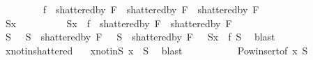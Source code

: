 \begin{isabellebody}
\begin{isamarkuptext}
\end{isamarkuptext}\isamarkuptrue%
\ \ \ \ \ \ \isamarkupfalse%
\ {}{\isacharcolon}{\kern0pt}\ {\isachardoublequoteopen}{\isacharquery}{\kern0pt}f\ {\isacharbackquote}{\kern0pt}\ {\isacharparenleft}{\kern0pt}shattered{\isacharunderscore}{\kern0pt}by\ {\isacharquery}{\kern0pt}F{}\ {\isasyminter}\ shattered{\isacharunderscore}{\kern0pt}by\ {\isacharquery}{\kern0pt}F{}{\isacharparenright}{\kern0pt}\ {\isasymsubseteq}\ shattered{\isacharunderscore}{\kern0pt}by\ F{\isachardoublequoteclose}\isanewline
\ \ \ \ \ \ \isamarkupfalse%
\ \isanewline
\ \ \ \ \ \ \ \ \isamarkupfalse%
\ S{\isacharunderscore}{\kern0pt}x\isanewline
\ \ \ \ \ \ \ \ \isamarkupfalse%
\ {\isachardoublequoteopen}S{\isacharunderscore}{\kern0pt}x\ {\isasymin}\ {\isacharquery}{\kern0pt}f\ {\isacharbackquote}{\kern0pt}\ {\isacharparenleft}{\kern0pt}shattered{\isacharunderscore}{\kern0pt}by\ {\isacharquery}{\kern0pt}F{}\ {\isasyminter}\ shattered{\isacharunderscore}{\kern0pt}by\ {\isacharquery}{\kern0pt}F{}{\isacharparenright}{\kern0pt}{\isachardoublequoteclose}\isanewline
\ \ \ \ \ \ \ \ \isamarkupfalse%
\ \isamarkupfalse%
\ S\ \ {}{}{\isacharcolon}{\kern0pt}\ {\isachardoublequoteopen}S\ {\isasymin}\ shattered{\isacharunderscore}{\kern0pt}by\ {\isacharquery}{\kern0pt}F{}{\isachardoublequoteclose}\ \ {}{}{\isacharcolon}{\kern0pt}\ {\isachardoublequoteopen}S\ {\isasymin}\ shattered{\isacharunderscore}{\kern0pt}by\ {\isacharquery}{\kern0pt}F{}{\isachardoublequoteclose}\ \ {}{}{\isacharcolon}{\kern0pt}\ {\isachardoublequoteopen}S{\isacharunderscore}{\kern0pt}x\ {\isacharequal}{\kern0pt}\ {\isacharquery}{\kern0pt}f\ S{\isachardoublequoteclose}\ \isamarkupfalse%
\ blast\isanewline
\ \ \ \ \ \ \ \ \isamarkupfalse%
\ x{\isacharunderscore}{\kern0pt}not{\isacharunderscore}{\kern0pt}in{\isacharunderscore}{\kern0pt}shattered\ {}{}\ \isamarkupfalse%
\ x{\isacharunderscore}{\kern0pt}not{\isacharunderscore}{\kern0pt}in{\isacharunderscore}{\kern0pt}S{\isacharcolon}{\kern0pt}\ {\isachardoublequoteopen}x\ {\isasymnotin}\ S{\isachardoublequoteclose}\ \isamarkupfalse%
\ blast\isanewline
\isanewline
\ \ \ \ \ \ \ \ \isamarkupfalse%
\ {}{}\ Pow{\isacharunderscore}{\kern0pt}insert{\isacharbrackleft}{\kern0pt}of\ x\ S{\isacharbrackright}{\kern0pt}\ \isamarkupfalse%

\end{isabellebody}
